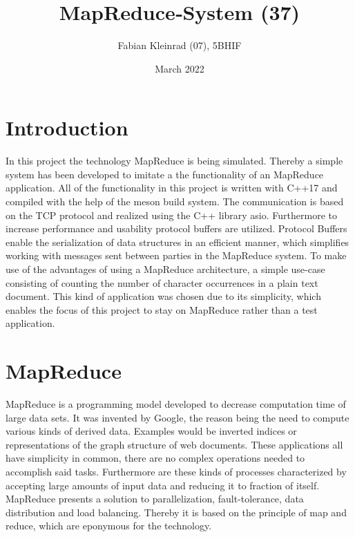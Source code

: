 \documentclass[12pt, letterpaper]{article}
\title{MapReduce‐System (37)}
\author{Fabian Kleinrad (07), 5BHIF}
\date{March 2022}
\begin{document}
\begin{titlepage}
\maketitle
\end{titlepage}

\tableofcontents
\newpage

\section{Introduction}

In this project the technology MapReduce is being simulated. Thereby a simple system has been developed to imitate a the functionality of an MapReduce application. All of the functionality in this project is written with C++17 and compiled with the help of the meson build system. The communication is based on the TCP protocol and realized using the C++ library asio.\newline
Furthermore to increase performance and usability protocol buffers are utilized. Protocol Buffers enable the serialization of data structures in an efficient manner, which simplifies working with messages sent between parties in the MapReduce system.\newline
To make use of the advantages of using a MapReduce architecture, a simple use-case consisting of counting the number of character occurrences in a plain text document. This kind of application was chosen due to its simplicity, which enables the focus of this project to stay on MapReduce rather than a test application. 

\section{MapReduce}

MapReduce is a programming model developed to decrease computation time of large data sets. It was invented by Google, the reason being the need to compute various kinds of derived data. Examples would be inverted indices or representations of the graph structure of web documents. These applications all have simplicity in common, there are no complex operations needed to accomplish said tasks. Furthermore are these kinds of processes characterized by accepting large amounts of input data and reducing it to fraction of itself. MapReduce presents a solution to parallelization, fault-tolerance, data distribution and load balancing. Thereby it is based on the principle of map and reduce, which are eponymous for the technology.
\end{document}
